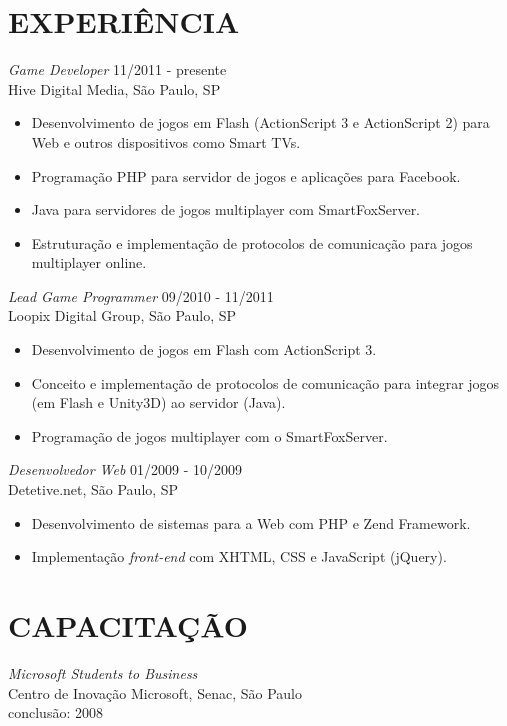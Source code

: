 \documentclass[line,margin]{res}
\begin{document}
\begin{resume}
\section{EXPERIÊNCIA} {\sl Game Developer} \hfill 11/2011 - presente \\
                Hive Digital Media, São Paulo, SP
                 \begin{itemize}  \itemsep -3pt
                 \item Desenvolvimento de jogos em Flash (ActionScript 3 e ActionScript 2) para Web e outros dispositivos como Smart TVs.
                 \item Programação PHP para servidor de jogos e aplicações para Facebook.
                 \item Java para servidores de jogos multiplayer com SmartFoxServer.
                 \item Estruturação e implementação de protocolos de comunicação para jogos multiplayer online.
                 \end{itemize}
                 
                 {\sl Lead Game Programmer} \hfill 09/2010 - 11/2011 \\
                Loopix Digital Group, São Paulo, SP
                 \begin{itemize}  \itemsep -3pt
                 \item Desenvolvimento de jogos em Flash com ActionScript 3.
                 \item Conceito e implementação de protocolos de comunicação para integrar jogos (em Flash e Unity3D) ao servidor (Java).
                 \item Programação de jogos multiplayer com o SmartFoxServer.
                 \end{itemize}
 
                {\sl Desenvolvedor Web} \hfill 01/2009 - 10/2009 \\
                Detetive.net, São Paulo, SP
                 \begin{itemize}  \itemsep -3pt
                 \item Desenvolvimento de sistemas para a Web com PHP e Zend Framework.
                 \item Implementação {\sl front-end} com XHTML, CSS e JavaScript (jQuery).
                 \end{itemize} 

\section{CAPACITAÇÃO}             
           {\sl Microsoft Students to Business} \\
                Centro de Inovação Microsoft, Senac, São Paulo \\
                conclusão: 2008 



\end{resume}
\end{document}
